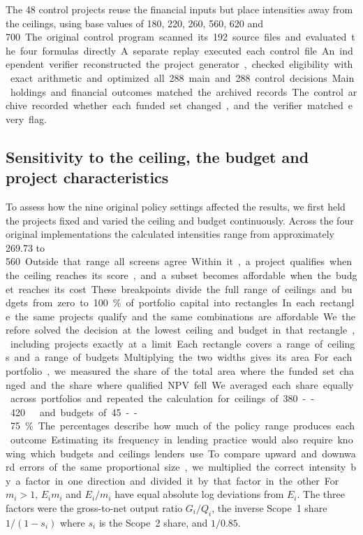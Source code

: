 The 48 control projects reuse the financial inputs but place intensities away from the ceilings, using base values of 180, 220, 260, 560, 620 and 700~\unit. The original control program scanned its 192 source files and evaluated the four formulas directly. A separate replay executed each control file. An independent verifier reconstructed the project generator, checked eligibility with exact arithmetic and optimized all 288 main and 288 control decisions. Main holdings and financial outcomes matched the archived records. The control archive recorded whether each funded set changed, and the verifier matched every flag.

\subsection{Sensitivity to the ceiling, the budget and project characteristics}
To assess how the nine original policy settings affected the results, we first held the projects fixed and varied the ceiling and budget continuously. Across the four original implementations the calculated intensities range from approximately 269.73 to 560~\unit. Outside that range all screens agree. Within it, a project qualifies when the ceiling reaches its score, and a subset becomes affordable when the budget reaches its cost. These breakpoints divide the full range of ceilings and budgets from zero to 100\% of portfolio capital into rectangles. In each rectangle the same projects qualify and the same combinations are affordable. We therefore solved the decision at the lowest ceiling and budget in that rectangle, including projects exactly at a limit.

Each rectangle covers a range of ceilings and a range of budgets. Multiplying the two widths gives its area. For each portfolio, we measured the share of the total area where the funded set changed and the share where qualified NPV fell. We averaged each share equally across portfolios and repeated the calculation for ceilings of 380--420~\unit\ and budgets of 45--75\%. The percentages describe how much of the policy range produces each outcome. Estimating its frequency in lending practice would also require knowing which budgets and ceilings lenders use.

To compare upward and downward errors of the same proportional size, we multiplied the correct intensity by a factor in one direction and divided it by that factor in the other. For $m_i>1$, $E_i m_i$ and $E_i/m_i$ have equal absolute log deviations from $E_i$. The three factors were the gross-to-net output ratio $G_i/Q_i$, the inverse Scope~1 share $1/(1-s_i)$ where $s_i$ is the Scope~2 share, and $1/0.85$.

